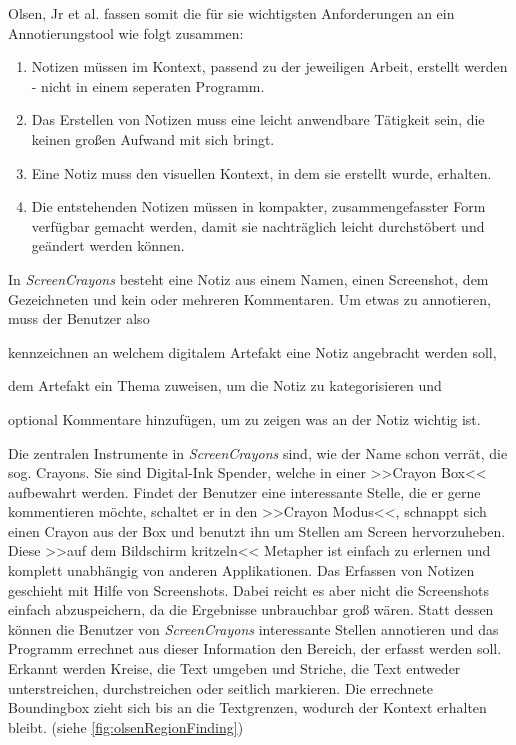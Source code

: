 \medskip Olsen, Jr et al. fassen somit die für sie wichtigsten Anforderungen an ein Annotierungstool wie folgt zusammen:

\begin{enumerate}
	\item Notizen müssen im Kontext, passend zu der jeweiligen Arbeit, erstellt werden - nicht in einem seperaten Programm.
	\item Das Erstellen von Notizen muss eine leicht anwendbare Tätigkeit sein, die keinen großen Aufwand mit sich bringt.
	\item Eine Notiz muss den visuellen Kontext, in dem sie erstellt wurde, erhalten.
	\item Die entstehenden Notizen müssen in kompakter, zusammengefasster Form verfügbar gemacht werden, damit sie nachträglich leicht durchstöbert und geändert werden können.
\end{enumerate}

In \emph{ScreenCrayons} besteht eine Notiz aus einem Namen, einen Screenshot, dem Gezeichneten und kein oder mehreren Kommentaren. Um etwas zu annotieren, muss der Benutzer also 
\begin{inparaenum}[\itshape 1\upshape)]
\item kennzeichnen an welchem digitalem Artefakt eine Notiz angebracht werden soll,
\item dem Artefakt ein Thema zuweisen, um die Notiz zu kategorisieren und
\item optional Kommentare hinzufügen, um zu zeigen was an der Notiz wichtig ist.
\end{inparaenum}

\medskip Die zentralen Instrumente in \emph{ScreenCrayons} sind, wie der Name schon verrät, die sog. Crayons. Sie sind Digital-Ink Spender, welche in einer >>Crayon Box<< aufbewahrt werden. Findet der Benutzer eine interessante Stelle, die er gerne kommentieren möchte, schaltet er in den >>Crayon Modus<<, schnappt sich einen Crayon aus der Box und benutzt ihn um Stellen am Screen hervorzuheben. Diese >>auf dem Bildschirm kritzeln<< Metapher ist einfach zu erlernen und komplett unabhängig von anderen Applikationen.
Das Erfassen von Notizen geschieht mit Hilfe von Screenshots. Dabei reicht es aber nicht die Screenshots einfach abzuspeichern, da die Ergebnisse unbrauchbar groß wären. Statt dessen können die Benutzer von \emph{ScreenCrayons} interessante Stellen annotieren und das Programm errechnet aus dieser Information den Bereich, der erfasst werden soll. Erkannt werden Kreise, die Text umgeben und Striche, die Text entweder unterstreichen, durchstreichen oder seitlich markieren. Die errechnete Boundingbox zieht sich bis an die Textgrenzen, wodurch der Kontext erhalten bleibt. (siehe \autoref{fig:olsenRegionFinding}) 

